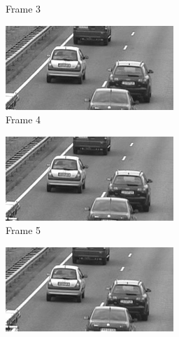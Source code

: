 \documentclass[a4paper, landscape]{article}
\begin{document}
\begin{figure}[H]
\begin{subfigure}{0.13\linewidth}
		\caption{Frame 3}
	\end{subfigure}
	\begin{subfigure}{0.13\linewidth}
		\centering
		\includegraphics[width=\linewidth]{cars/frame = 4.png}
		\caption{Frame 4}
	\end{subfigure}
	\begin{subfigure}{0.13\linewidth}
		\centering
		\includegraphics[width=\linewidth]{cars/frame = 5.png}
		\caption{Frame 5}
	\end{subfigure}
	\begin{subfigure}{0.13\linewidth}
		\centering
		\includegraphics[width=\linewidth]{cars/frame = 6.png}

\end{subfigure}
\end{figure}
\end{document}
